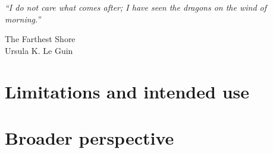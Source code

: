 \epigraph{
    \emph{
        ``I do not care what comes after; I have seen the dragons on the wind of morning.''
} 
%
}
{The Farthest Shore\\Ursula K. Le Guin}
\section{Limitations and intended use}\label{sec:ch7-limitations}
\section{Broader perspective}\label{sec:broader-perspective}
